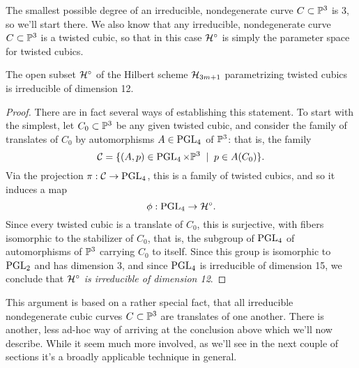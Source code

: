The smallest possible degree of an irreducible, nondegenerate curve $C \subset {\mathbb P}^3$ is 3, so we'll start there. We also know that any irreducible, nondegenerate curve $C \subset {\mathbb P}^3$ is a twisted cubic, so that in this case ${\cal H}^\circ$ is simply the parameter space for twisted cubics.

\begin{proposition}\label{hilb of twisted cubics}
The open subset ${\cal H}^\circ$ of the Hilbert scheme ${\cal H}_{3m+1}$ parametrizing twisted cubics is irreducible of dimension 12.
\end{proposition}

\begin{proof}  There are in fact several ways of establishing this statement. To start with the simplest, let $C_0 \subset {\mathbb P}^3$ be any given twisted cubic, and consider the family of translates of $C_0$ by automorphisms $A \in \operatorname{PGL}_4$ of ${\mathbb P}^3$: that is, the family
$$
{\cal C} = \{ (A, p) \in \operatorname{PGL}_4 \times {\mathbb P}^3 \; \mid \; p \in A(C_0) \}.
$$
Via the projection $\pi : {\cal C} \to \operatorname{PGL}_4$, this is a family of twisted cubics, and so it induces a map
$$
\phi : \operatorname{PGL}_4 \to {\cal H}^\circ.
$$
Since every twisted cubic is a translate of $C_0$, this is surjective, with fibers isomorphic to the stabilizer of $C_0$, that is, the subgroup of $\operatorname{PGL}_4$ of automorphisms of ${\mathbb P}^3$ carrying $C_0$ to itself. Since this group is isomorphic to $\operatorname{PGL}_2$ and has dimension 3, and since $\operatorname{PGL}_4$ is irreducible of dimension 15, we conclude that \emph{${\cal H}^\circ$ is irreducible of dimension 12}.
\end{proof}


This argument is based on a rather special fact, that all irreducible nondegenerate cubic curves $C \subset {\mathbb P}^3$ are translates of one another. There is another, less ad-hoc way of arriving at the conclusion above which we'll now describe. While it seem much more involved, as we'll see in the next couple of sections it's a broadly applicable technique in general.

